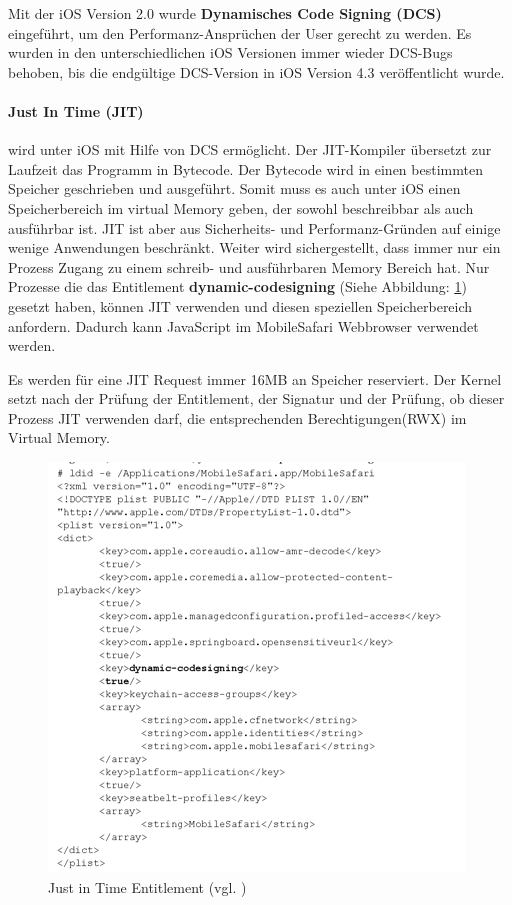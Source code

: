 Mit der iOS Version 2.0 wurde \textbf{Dynamisches Code Signing (DCS)} eingeführt, um den Performanz-Ansprüchen der User gerecht zu werden. Es wurden in den unterschiedlichen iOS Versionen immer wieder DCS-Bugs behoben, bis die endgültige DCS-Version in iOS Version 4.3 veröffentlicht wurde. 
\paragraph{Just In Time (JIT)} wird unter iOS mit Hilfe von DCS ermöglicht. Der JIT-Kompiler übersetzt zur Laufzeit das Programm in Bytecode. Der Bytecode wird in einen bestimmten Speicher geschrieben und ausgeführt. Somit muss es auch unter iOS einen Speicherbereich im virtual Memory geben, der sowohl beschreibbar als auch ausführbar ist.  JIT ist aber aus Sicherheits- und Performanz-Gründen auf einige wenige Anwendungen beschränkt. Weiter wird sichergestellt, dass immer nur ein Prozess Zugang zu einem schreib- und ausführbaren Memory Bereich hat. Nur Prozesse die das Entitlement \textbf{dynamic-codesigning} (Siehe Abbildung: \ref{fig:JIT}) gesetzt haben, können JIT verwenden und diesen speziellen Speicherbereich anfordern. Dadurch kann JavaScript im MobileSafari Webbrowser verwendet werden. 

Es werden für eine JIT Request immer 16MB an Speicher reserviert. Der Kernel setzt nach der Prüfung der Entitlement, der Signatur und der Prüfung, ob dieser Prozess JIT verwenden darf, die entsprechenden Berechtigungen(RWX) im Virtual Memory.

\begin{figure}[!ht]
        \centering
                \includegraphics[scale=0.8]{JIT}
        \caption{Just in Time Entitlement (vgl. \cite{Hacking[1]}) }
        \label{fig:JIT}
\end{figure}

